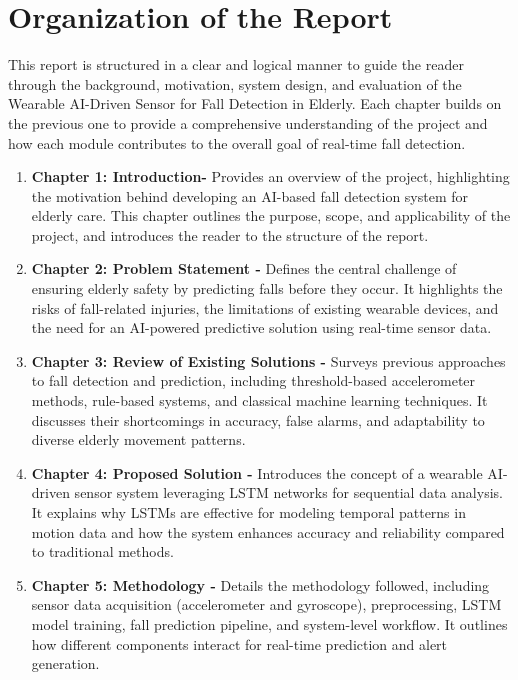 \documentclass[a4paper, 12pt]{report}
\begin{document}
\section{Organization of the Report}
This report is structured in a clear and logical manner to guide the reader through the background, motivation, system design, and evaluation of the Wearable AI-Driven Sensor for Fall Detection in Elderly. Each chapter builds on the previous one to provide a comprehensive understanding of the project and how each module contributes to the overall goal of real-time fall detection.

\begin{enumerate}[itemsep=-4pt, label=\textbf{\roman*.}]
    \item \textbf{Chapter 1: Introduction- }Provides an overview of the project, highlighting the motivation behind developing an AI-based fall detection system for elderly care. This chapter outlines the purpose, scope, and applicability of the project, and introduces the reader to the structure of the report.
    
    \item \textbf{Chapter 2: Problem Statement -} Defines the central challenge of ensuring elderly safety by predicting falls before they occur. It highlights the risks of fall-related injuries, the limitations of existing wearable devices, and the need for an AI-powered predictive solution using real-time sensor data.
    
    \item \textbf{Chapter 3: Review of Existing Solutions -} Surveys previous approaches to fall detection and prediction, including threshold-based accelerometer methods, rule-based systems, and classical machine learning techniques. It discusses their shortcomings in accuracy, false alarms, and adaptability to diverse elderly movement patterns.
    
    \item \textbf{Chapter 4: Proposed Solution -} Introduces the concept of a wearable AI-driven sensor system leveraging LSTM networks for sequential data analysis. It explains why LSTMs are effective for modeling temporal patterns in motion data and how the system enhances accuracy and reliability compared to traditional methods.
    
    \item \textbf{Chapter 5: Methodology -} Details the methodology followed, including sensor data acquisition (accelerometer and gyroscope), preprocessing, LSTM model training, fall prediction pipeline, and system-level workflow. It outlines how different components interact for real-time prediction and alert generation.
    

\end{enumerate}
\end{document}

